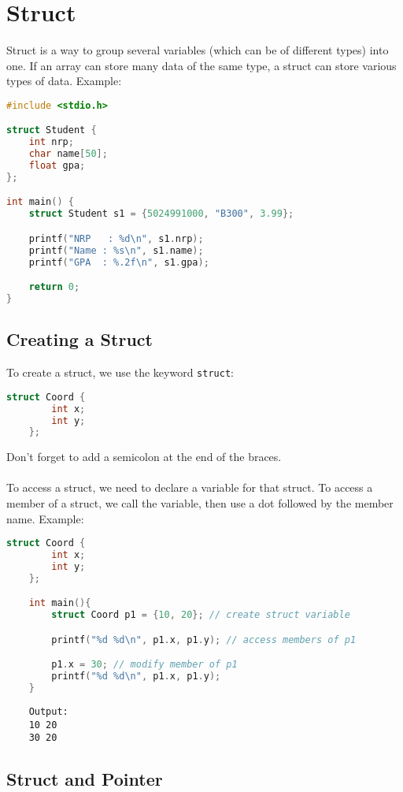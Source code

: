\section{Struct}

Struct is a way to group several variables (which can be of different types) into one.
If an array can store many data of the same type, a struct can store various types of data.
Example:
\begin{lstlisting}[language=c]
#include <stdio.h>

struct Student {
	int nrp;
	char name[50];
	float gpa;
};

int main() {
	struct Student s1 = {5024991000, "B300", 3.99};

	printf("NRP   : %d\n", s1.nrp);
	printf("Name : %s\n", s1.name);
	printf("GPA  : %.2f\n", s1.gpa);

	return 0;
}
\end{lstlisting}

\subsection{Creating a Struct}

To create a struct, we use the keyword \texttt{struct}:
{
\captionsetup[lstlisting]{labelformat=empty, justification=raggedright, singlelinecheck=false} %
\begin{lstlisting}[language=c, caption={syntax}]
	struct Coord {
		int x;
		int y;
	};
\end{lstlisting}
}
Don't forget to add a semicolon at the end of the braces.\\\\
To access a struct, we need to declare a variable for that struct.
To access a member of a struct, we call the variable, then use a dot followed by the member name.
Example:
\begin{lstlisting}[language=c]
	struct Coord {
		int x;
		int y;
	};

	int main(){
		struct Coord p1 = {10, 20}; // create struct variable

		printf("%d %d\n", p1.x, p1.y); // access members of p1

		p1.x = 30; // modify member of p1
		printf("%d %d\n", p1.x, p1.y);
	}    
\end{lstlisting}
\begin{verbatim}
    Output:
    10 20
    30 20    
\end{verbatim}

\subsection{Struct and Pointer}

